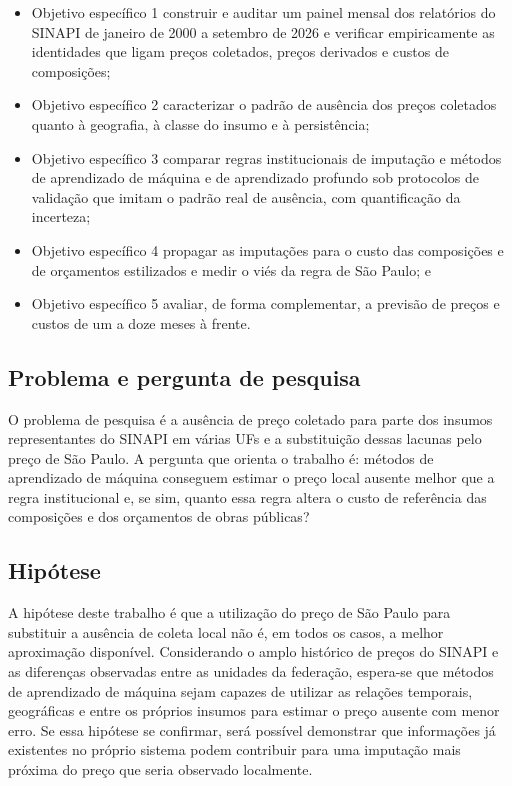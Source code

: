 \begin{itemize}
  \item Objetivo específico 1 construir e auditar um painel mensal dos relatórios do 
  SINAPI de janeiro de 2000 a setembro de 2026 e verificar empiricamente as identidades 
  que ligam preços coletados, preços derivados e custos de composições;
  \item Objetivo específico 2 caracterizar o padrão de ausência dos preços coletados 
  quanto à geografia, à classe do insumo e à persistência;
  \item Objetivo específico 3 comparar regras institucionais de imputação e métodos de 
  aprendizado de máquina e de aprendizado profundo sob protocolos de validação que 
  imitam o padrão real de ausência, com quantificação da incerteza;
  \item Objetivo específico 4 propagar as imputações para o custo das composições e de 
  orçamentos estilizados e medir o viés da regra de São Paulo; e
  \item Objetivo específico 5 avaliar, de forma complementar, a previsão de preços e 
  custos de um a doze meses à frente.
\end{itemize}

\subsection{Problema e pergunta de pesquisa}

O problema de pesquisa é a ausência de preço coletado para parte dos insumos representantes
do SINAPI em várias UFs e a substituição dessas lacunas pelo preço de São Paulo. A
pergunta que orienta o trabalho é: métodos de aprendizado de máquina conseguem estimar o
preço local ausente melhor que a regra institucional e, se sim, quanto essa regra altera o custo
de referência das composições e dos orçamentos de obras públicas?

\subsection{Hipótese}

A hipótese deste trabalho é que a utilização do preço de São Paulo para substituir a 
ausência de coleta local não é, em todos os casos, a melhor aproximação disponível. 
Considerando o amplo histórico de preços do SINAPI e as diferenças observadas entre as 
unidades da federação, espera-se que métodos de aprendizado de máquina sejam capazes de 
utilizar as relações temporais, geográficas e entre os próprios insumos para estimar o 
preço ausente com menor erro. Se essa hipótese se confirmar, será possível demonstrar 
que informações já existentes no próprio sistema podem contribuir para uma imputação 
mais próxima do preço que seria observado localmente.

